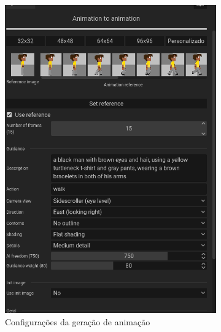 \begin{figure}[htbp]
    \centering
    \caption{\small Processo da utilização 10 da ferramenta de animação do PixelLab em julho/2025}
    \label{fig:pixelLabAnimacao10}

    \begin{subfigure}{0.6\linewidth}
        \includegraphics[width=1\linewidth]{figs/pixelLab/dia4/tela5_teste2.PNG}
        \caption{\small Configurações da geração de animação}
        \label{fig:pixelLabAnimacao10a}
    \end{subfigure}
    \begin{subfigure}{0.35\linewidth}

\end{subfigure}
\end{figure}
